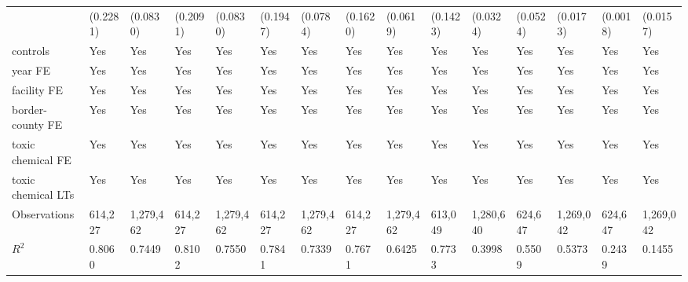 \begin{table}[H]
{\begin{tabular}{@{}lllllllllllllll@{}}
            & (0.2281)  & (0.0830)  & (0.2091)  & (0.0830)  & (0.1947) & (0.0784)  & (0.1620)  & (0.0619)   & (0.1423) & (0.0324)  & (0.0524)  & (0.0173)  & (0.0018) & (0.0157)  \\
            controls           & Yes       & Yes       & Yes       & Yes       & Yes      & Yes       & Yes       & Yes        & Yes      & Yes       & Yes       & Yes       & Yes      & Yes       \\
            year FE            & Yes       & Yes       & Yes       & Yes       & Yes      & Yes       & Yes       & Yes        & Yes      & Yes       & Yes       & Yes       & Yes      & Yes       \\
            facility FE        & Yes       & Yes       & Yes       & Yes       & Yes      & Yes       & Yes       & Yes        & Yes      & Yes       & Yes       & Yes       & Yes      & Yes       \\
            border-county FE   & Yes       & Yes       & Yes       & Yes       & Yes      & Yes       & Yes       & Yes        & Yes      & Yes       & Yes       & Yes       & Yes      & Yes       \\
            toxic chemical FE  & Yes       & Yes       & Yes       & Yes       & Yes      & Yes       & Yes       & Yes        & Yes      & Yes       & Yes       & Yes       & Yes      & Yes       \\
            toxic chemical LTs & Yes       & Yes       & Yes       & Yes       & Yes      & Yes       & Yes       & Yes        & Yes      & Yes       & Yes       & Yes       & Yes      & Yes       \\ \midrule
            Observations       & 614,227   & 1,279,462 & 614,227   & 1,279,462 & 614,227  & 1,279,462 & 614,227   & 1,279,462  & 613,049  & 1,280,640 & 624,647   & 1,269,042 & 624,647  & 1,269,042 \\
            $R^2$              & 0.8060    & 0.7449    & 0.8102    & 0.7550    & 0.7841   & 0.7339    & 0.7671    & 0.6425     & 0.7733   & 0.3998    & 0.5509    & 0.5373    & 0.2439   & 0.1455    \\ \bottomrule\bottomrule
        \end{tabular}%
    }
    \begin{minipage}{18cm}
        \vspace{0.05in}

\end{minipage}
\end{table}
